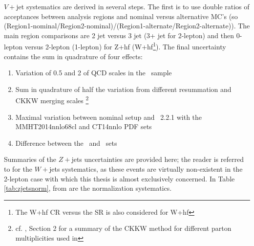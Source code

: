 $V+$jet systematics are derived in several steps.  The first is to use double ratios of acceptances between analysis regions and nominal versus alternative MC's (so (Region1-nominal/Region2-nominal)/(Region1-alternate/Region2-alternate)).  The main region comparisons are 2 jet versus 3 jet (3+ jet for 2-lepton) and then 0-lepton versus 2-lepton (1-lepton) for Z+hf (W+hf\footnote{The W+hf CR versus the SR is also considered for W+hf}).  The final uncertainty contains the sum in quadrature of four effects:
\begin{enumerate}
\item Variation of 0.5 and 2 of QCD scales in the \sherpa\, sample
\item Sum in quadrature of half the variation from different resummation and CKKW merging scales \footnote{cf. \cite{modeling25}, Section 2 for a summary of the CKKW method for different parton multiplicities used in \sherpa}
\item Maximal variation between nominal setup and \sherpa\, 2.2.1 with the MMHT2014nnlo68cl and CT14nnlo PDF sets
\item Difference between the \sherpa\, and \mg\, sets
\end{enumerate}

Summaries of the $Z+$jets uncertainties are provided here; the reader is referred to \cite{modelingnote} for the $W+$jets systematics, as these events are virtually non-existent in the 2-lepton case with which this thesis is almost exclusively concerned.  In Table \ref{tab:zjetsnorm}, from \cite{modelingnote} are the normalization systematics.

